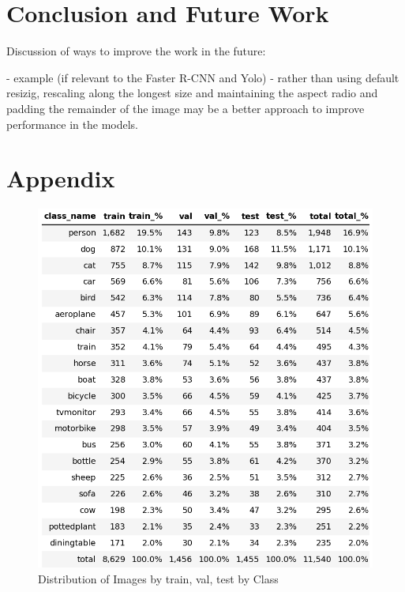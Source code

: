 \documentclass{article}
\begin{document}
\section{Conclusion and Future Work}

Discussion of ways to improve the work in the future:

- example (if relevant to the Faster R-CNN and Yolo) - rather than using default resizig, rescaling along the longest size and maintaining the aspect radio and padding the remainder of the image may be a better approach to improve performance in the models.

\section{Appendix}
\begin{figure}[h]
  \includegraphics[scale = 0.5]{df_styled.jpg}
  \centering
  \caption{Distribution of Images by train, val, test by Class}
  \label{fig:data_overview}
\end{figure}
\end{document}
